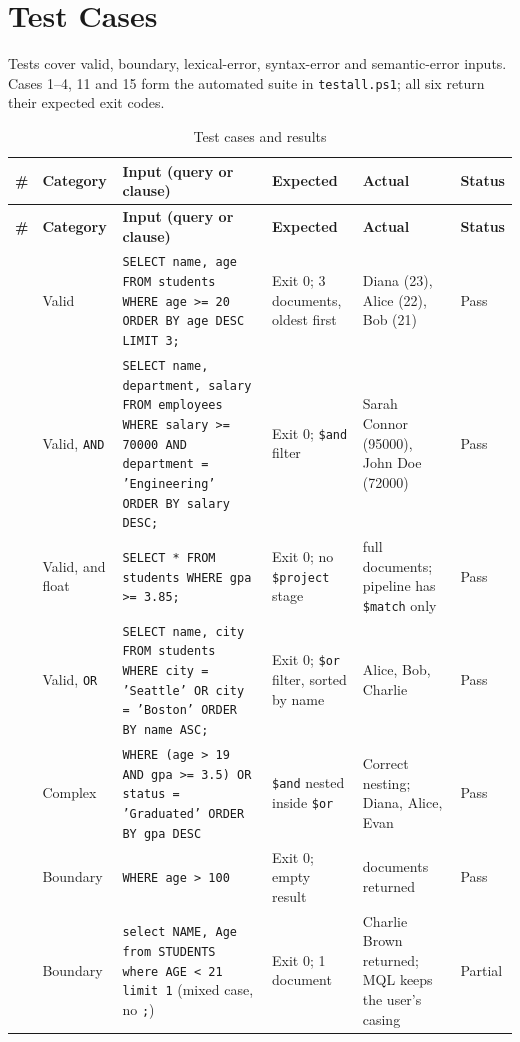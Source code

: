\documentclass[12pt,a4paper]{report}
\newcommand{\codeus}{\textunderscore\allowbreak}
\DeclareRobustCommand{\code}[1]{\texttt{\let\_\codeus #1}}
\begin{document}
\section{Test Cases}
Tests cover valid, boundary, lexical-error, syntax-error and semantic-error inputs. Cases 1--4, 11 and 15 form the automated suite in \code{test\_all.ps1}; all six return their expected exit codes.

{\footnotesize
\setlength{\tabcolsep}{3.5pt}
\begin{longtable}{|>{\raggedright\arraybackslash}p{0.45cm}|>{\raggedright\arraybackslash}p{1.75cm}|>{\raggedright\arraybackslash}p{4.9cm}|>{\raggedright\arraybackslash}p{2.4cm}|>{\raggedright\arraybackslash}p{3.2cm}|>{\raggedright\arraybackslash}p{1.1cm}|}
\caption{Test cases and results}\\
\hline
\textbf{\#} & \textbf{Category} & \textbf{Input (query or clause)} & \textbf{Expected} & \textbf{Actual} & \textbf{Status} \\ \hline
\endfirsthead
\hline
\textbf{\#} & \textbf{Category} & \textbf{Input (query or clause)} & \textbf{Expected} & \textbf{Actual} & \textbf{Status} \\ \hline
\endhead
1 & Valid & \code{SELECT name, age FROM students WHERE age >= 20 ORDER BY age DESC LIMIT 3;} & Exit 0; 3 documents, oldest first & Diana (23), Alice (22), Bob (21) & Pass \\ \hline
2 & Valid, \code{AND} & \code{SELECT name, department, salary FROM employees WHERE salary >= 70000 AND department = 'Engineering' ORDER BY salary DESC;} & Exit 0; \code{\$and} filter & Sarah Connor (95000), John Doe (72000) & Pass \\ \hline
3 & Valid, \code{*} and float & \code{SELECT * FROM students WHERE gpa >= 3.85;} & Exit 0; no \code{\$project} stage & 3 full documents; pipeline has \code{\$match} only & Pass \\ \hline
4 & Valid, \code{OR} & \code{SELECT name, city FROM students WHERE city = 'Seattle' OR city = 'Boston' ORDER BY name ASC;} & Exit 0; \code{\$or} filter, sorted by name & Alice, Bob, Charlie & Pass \\ \hline
5 & Complex & \code{WHERE (age > 19 AND gpa >= 3.5) OR status = 'Graduated' ORDER BY gpa DESC} & \code{\$and} nested inside \code{\$or} & Correct nesting; Diana, Alice, Evan & Pass \\ \hline
6 & Boundary & \code{WHERE age > 100} & Exit 0; empty result & 0 documents returned & Pass \\ \hline
7 & Boundary & \code{select NAME, Age from STUDENTS where AGE < 21 limit 1} (mixed case, no \code{;}) & Exit 0; 1 document & Charlie Brown returned; MQL keeps the user's casing & Partial \\ \hline

\end{longtable}}
\end{document}
